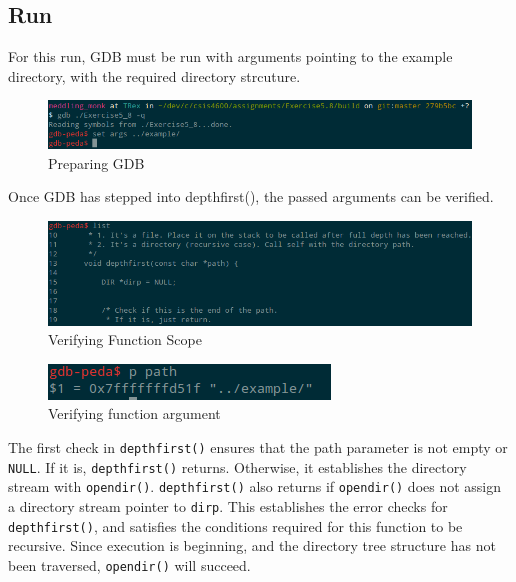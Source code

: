 \documentclass[a4paper,12pt,sffamily]{article}
\begin{document}
\subsection{Run}
For this run, GDB must be run with arguments pointing to the example directory, with the required 
directory strcuture.
\begin{figure}[H]
\centering
\includegraphics[width=1\linewidth]{./images/1}
\caption[GDB_prep]{Preparing GDB}
\label{fig:2}
\end{figure}
Once GDB has stepped into depthfirst(), the passed arguments can be verified.
\begin{figure}[H]
	\centering
	\includegraphics[width=1\linewidth]{./images/2}
	\caption[GDB_verify_1]{Verifying Function Scope}
	\label{fig:3}
\end{figure}
\begin{figure}[H]
	\centering
	\includegraphics[width=.5\linewidth]{./images/3}
	\caption[GDB_verify_2]{Verifying function argument}
	\label{fig:4}
\end{figure}
The first check in \texttt{depthfirst()} ensures that the path parameter is not empty or 
\texttt{NULL}. If it is, \texttt{depthfirst()} returns. Otherwise, it establishes the 
directory stream with \texttt{opendir()}. \texttt{depthfirst()} also returns if 
\texttt{opendir()} does not assign a directory stream pointer to \texttt{dirp}. This 
establishes the error checks for \texttt{depthfirst()}, and satisfies the conditions required for 
this function to be recursive.
Since execution is beginning, and the directory tree structure has not been traversed, 
\texttt{opendir()} will succeed.
\end{document}
